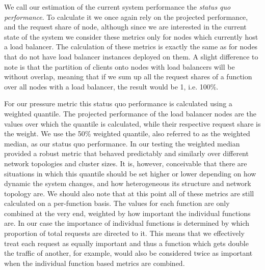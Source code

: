 We call our estimation of the current system performance the \textit{status quo performance}.
To calculate it we once again rely on the projected performance, and the request share of node, although since we are interested in the current state of the system we consider these metrics only for nodes which currently host a load balancer.
The calculation of these metrics is exactly the same as for nodes that do not have load balancer instances deployed on them.
A slight difference to note is that the partition of clients onto nodes with load balancers will be without overlap, meaning that if we sum up all the request shares of a function over all nodes with a load balancer, the result would be 1, i.e. 100\%.

For our pressure metric this status quo performance is calculated using a weighted quantile.
The projected performance of the load balancer nodes are the values over which the quantile is calculated, while their respective request share is the weight.
We use the 50\% weighted quantile, also referred to as the weighted median, as our status quo performance.
In our testing the weighted median provided a robust metric that behaved predictably and similarly over different network topologies and cluster sizes.
It is, however, conceivable that there are situations in which this quantile should be set higher or lower depending on how dynamic the system changes, and how heterogeneous its structure and network topology are.
We should also note that at this point all of these metrics are still calculated on a per-function basis.
The values for each function are only combined at the very end, weighted by how important the individual functions are.
In our case the importance of individual functions is determined by which proportion of total requests are directed to it.
This means that we effectively treat each request as equally important and thus a function which gets double the traffic of another, for example, would also be considered twice as important when the individual function based metrics are combined.

